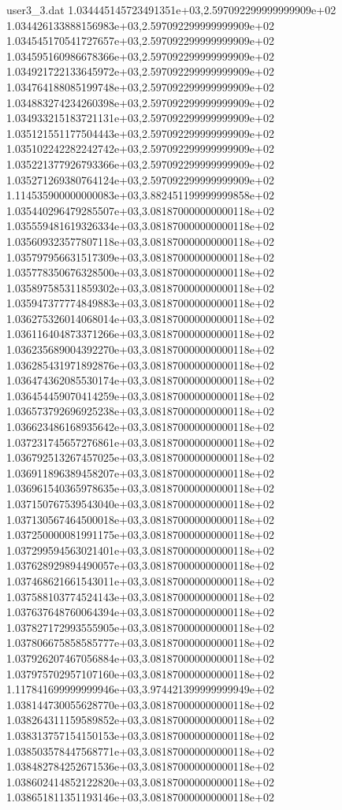 \begin{filecontents}{user3_3.dat}
1.034445145723491351e+03,2.597092299999999909e+02
1.034426133888156983e+03,2.597092299999999909e+02
1.034545170541727657e+03,2.597092299999999909e+02
1.034595160986678366e+03,2.597092299999999909e+02
1.034921722133645972e+03,2.597092299999999909e+02
1.034764188085199748e+03,2.597092299999999909e+02
1.034883274234260398e+03,2.597092299999999909e+02
1.034933215183721131e+03,2.597092299999999909e+02
1.035121551177504443e+03,2.597092299999999909e+02
1.035102242282242742e+03,2.597092299999999909e+02
1.035221377926793366e+03,2.597092299999999909e+02
1.035271269380764124e+03,2.597092299999999909e+02
1.114535900000000083e+03,3.882451199999999858e+02
1.035440296479285507e+03,3.081870000000000118e+02
1.035559481619326334e+03,3.081870000000000118e+02
1.035609323577807118e+03,3.081870000000000118e+02
1.035797956631517309e+03,3.081870000000000118e+02
1.035778350676328500e+03,3.081870000000000118e+02
1.035897585311859302e+03,3.081870000000000118e+02
1.035947377774849883e+03,3.081870000000000118e+02
1.036275326014068014e+03,3.081870000000000118e+02
1.036116404873371266e+03,3.081870000000000118e+02
1.036235689004392270e+03,3.081870000000000118e+02
1.036285431971892876e+03,3.081870000000000118e+02
1.036474362085530174e+03,3.081870000000000118e+02
1.036454459070414259e+03,3.081870000000000118e+02
1.036573792696925238e+03,3.081870000000000118e+02
1.036623486168935642e+03,3.081870000000000118e+02
1.037231745657276861e+03,3.081870000000000118e+02
1.036792513267457025e+03,3.081870000000000118e+02
1.036911896389458207e+03,3.081870000000000118e+02
1.036961540365978635e+03,3.081870000000000118e+02
1.037150767539543040e+03,3.081870000000000118e+02
1.037130567464500018e+03,3.081870000000000118e+02
1.037250000081991175e+03,3.081870000000000118e+02
1.037299594563021401e+03,3.081870000000000118e+02
1.037628929894490057e+03,3.081870000000000118e+02
1.037468621661543011e+03,3.081870000000000118e+02
1.037588103774524143e+03,3.081870000000000118e+02
1.037637648760064394e+03,3.081870000000000118e+02
1.037827172993555905e+03,3.081870000000000118e+02
1.037806675858585777e+03,3.081870000000000118e+02
1.037926207467056884e+03,3.081870000000000118e+02
1.037975702957107160e+03,3.081870000000000118e+02
1.117841699999999946e+03,3.974421399999999949e+02
1.038144730055628770e+03,3.081870000000000118e+02
1.038264311159589852e+03,3.081870000000000118e+02
1.038313757154150153e+03,3.081870000000000118e+02
1.038503578447568771e+03,3.081870000000000118e+02
1.038482784252671536e+03,3.081870000000000118e+02
1.038602414852122820e+03,3.081870000000000118e+02
1.038651811351193146e+03,3.081870000000000118e+02

\end{filecontents}
